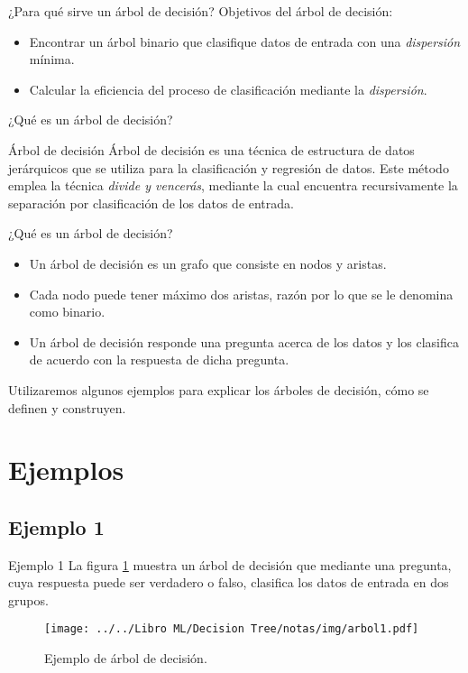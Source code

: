 \documentclass[11pt,aspectratio=169]{beamer}
\begin{document}
\begin{frame}{¿Para qué sirve un árbol de decisión?}
	Objetivos del árbol de decisión: \pause
	\begin{itemize}
		\item Encontrar un árbol binario que clasifique datos de entrada 
			con una \textit{dispersión} mínima. \pause
		\item Calcular la eficiencia del proceso de clasificación mediante 
			la \textit{dispersión}.
	\end{itemize}	
\end{frame}

\begin{frame}{¿Qué es un árbol de decisión?}
	\begin{block}{Árbol de decisión}
		Árbol de decisión es una técnica de estructura de datos jerárquicos 
		que se utiliza para la clasificación y regresión de datos.\pause 
		Este método emplea la técnica \textit{divide y vencerás}, mediante 
		la cual encuentra recursivamente la separación por clasificación de 
		los datos de entrada. 
	\end{block}
\end{frame}

\begin{frame}{¿Qué es un árbol de decisión?}
	\begin{itemize}
		\item Un árbol de decisión es un grafo que consiste en nodos y aristas.\pause
		\item Cada nodo puede tener máximo dos aristas, razón por lo que se le denomina 
		como binario.\pause
		\item Un árbol de decisión responde una pregunta acerca de los datos y los 
		clasifica de acuerdo con la respuesta de dicha pregunta. \pause
	\end{itemize}

	Utilizaremos algunos ejemplos para explicar los árboles de decisión, cómo se 
	definen y construyen.
\end{frame}

\section{Ejemplos}
\subsection{Ejemplo 1}
\begin{frame}{Ejemplo 1}
	La figura \ref{fig:arbol1} muestra un árbol de decisión que mediante una pregunta, 
	cuya respuesta puede ser verdadero o falso, clasifica los datos de entrada en dos 
	grupos. \pause

	\begin{figure}[H]
		\centering
		\texttt{[image: ../../Libro ML/Decision Tree/notas/img/arbol1.pdf]}
		\caption{Ejemplo de árbol de decisión.}
		\label{fig:arbol1}
	\end{figure}
\end{frame}
\end{document}

